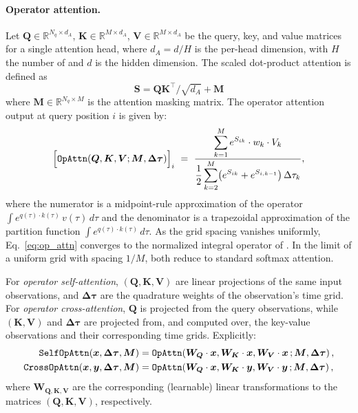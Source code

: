 \paragraph{Operator attention.}
Let $\bm{Q} \in \mathbb{R}^{N_q \times d_A}$,
$\bm{K} \in \mathbb{R}^{M \times d_A}$,
$\bm{V} \in \mathbb{R}^{M \times d_A}$ be the query, key, and value matrices
for a single attention head, where $d_A = d / H$ is the per-head dimension, with $H$ the number of  and $d$ is the hidden dimension. The scaled dot-product attention is defined as 
\begin{equation}
{\bm S} = {\bm Q \bm K}^\top / \sqrt{d_A} + \bm{M}
\end{equation}
where $\bm{M} \in \mathbb{R}^{N_q\times M}$ is the attention masking matrix. The operator attention output at query position $i$ is given by:
\begin{equation}
    \Bigl[\mathtt{OpAttn}(\bm{Q}, \bm{K}, \bm{V}; \bm{M}, \bm{\Delta\tau})\Bigr]_i
   \ =\
    \frac{%
        \displaystyle\sum_{k=1}^{M}
        e^{S_{ik}} \cdot w_k \cdot {V}_k
    }{%
        \displaystyle\frac{1}{2}
        \sum_{k=2}^{M}
        \bigl(e^{S_{ik}} + e^{S_{i,k-1}}\bigr)\,\Delta\tau_k
    },
    \label{eq:op_attn}
\end{equation}
where the numerator is a midpoint-rule approximation of the operator 
$\int e^{q(\tau)\cdot k(\tau)}\,v(\tau)\,d\tau$
and the denominator is a trapezoidal approximation of the partition function
$\int e^{q(\tau)\cdot k(\tau)}\,d\tau$.
As the grid spacing vanishes uniformly, Eq.~\eqref{eq:op_attn} converges to
the normalized integral operator of \citet{calvello2024continuum}.
In the limit of a uniform grid with spacing $1/M$, both reduce to standard
softmax attention.

For \emph{operator self-attention},
$(\bm{Q}, \bm{K}, \bm{V})$ are linear projections of the same input observations, and
$\bm{\Delta\tau}$ are the quadrature weights of the observation's time grid. For \emph{operator cross-attention}, $\bm{Q}$ is projected from the query observations,
while $(\bm{K}, \bm{V})$ and $\bm{\Delta\tau}$ are projected from, and computed over,
the key-value observations and their corresponding time grids. Explicitly:
\begin{align}
\mathtt{SelfOpAttn}(\bm{x},\bm{\Delta \tau}, \bm{M}) &= {\tt OpAttn}(\bm{W_Q}\cdot \bm{x}, \bm{W_K}\cdot \bm{x}, \bm{W_V}\cdot \bm{x}\,; \bm{M}, \bm{\Delta\tau})\,,\\
\mathtt{CrossOpAttn}(\bm{x}, \bm{y},\bm{\Delta \tau}, \bm{M}) &= {\tt OpAttn}(\bm{W_Q}\cdot \bm{x}, \bm{W_K}\cdot \bm{y}, \bm{W_V}\cdot \bm{y}\,; \bm{M},   \bm{\Delta\tau})\,,
\end{align}
where $\bm{W_{ Q,K,V}}$ are the corresponding (learnable) linear transformations to the matrices $(\bm{Q}, \bm{K}, \bm{V})$, respectively. 


